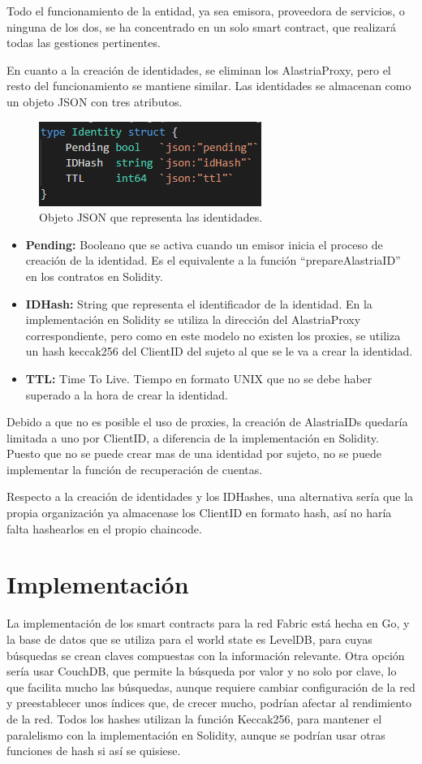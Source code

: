Todo el funcionamiento de la entidad, ya sea emisora, proveedora de servicios, o ninguna de los dos, se ha concentrado en un solo smart contract, que realizará todas las gestiones pertinentes.

En cuanto a la creación de identidades, se eliminan los AlastriaProxy, pero el resto del funcionamiento se mantiene similar. Las identidades se almacenan como un objeto JSON con tres atributos.
\begin{figure}[H]
\centerline{\includegraphics[scale=1]{recursos/identity.png}}
\caption{Objeto JSON que representa las identidades.}
\label{identity-json}
\end{figure}
\begin{itemize}
    \item \textbf{Pending:} Booleano que se activa cuando un emisor inicia el proceso de creación de la identidad. Es el equivalente a la función ``prepareAlastriaID'' en los contratos en Solidity.
    \item \textbf{IDHash:} String que representa el identificador de la identidad. En la implementación en Solidity se utiliza la dirección del AlastriaProxy correspondiente, pero como en este modelo no existen los proxies, se utiliza un hash keccak256 del ClientID del sujeto al que se le va a crear la identidad.
    \item \textbf{TTL:} Time To Live. Tiempo en formato UNIX que no se debe haber superado a la hora de crear la identidad.
\end{itemize}
Debido a que no es posible el uso de proxies, la creación de AlastriaIDs quedaría limitada a uno por ClientID, a diferencia de la implementación en Solidity. Puesto que no se puede crear mas de una identidad por sujeto, no se puede implementar la función de recuperación de cuentas.

Respecto a la creación de identidades y los IDHashes, una alternativa sería que la propia organización ya almacenase los ClientID en formato hash, así no haría falta hashearlos en el propio chaincode.

\section{Implementación}
La implementación de los smart contracts para la red Fabric está hecha en Go, y la base de datos que se utiliza para el world state es LevelDB, para cuyas búsquedas se crean claves compuestas con la información relevante. Otra opción sería usar CouchDB, que permite la búsqueda por valor y no solo por clave, lo que facilita mucho las búsquedas, aunque requiere cambiar configuración de la red y preestablecer unos índices que, de crecer mucho, podrían afectar al rendimiento de la red. Todos los hashes utilizan la función Keccak256, para mantener el paralelismo con la implementación en Solidity, aunque se podrían usar otras funciones de hash si así se quisiese.\\

